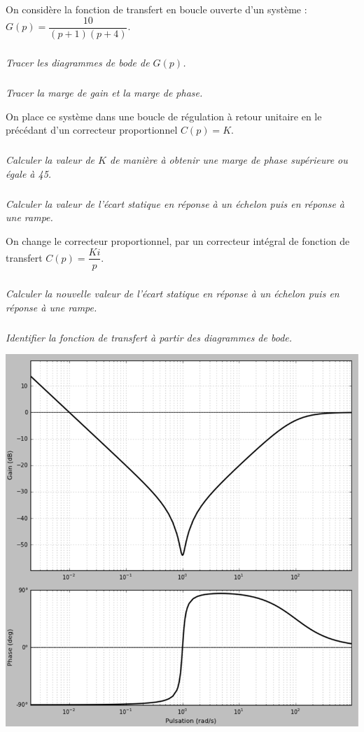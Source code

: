 \documentclass[10pt,fleqn]{article} %
\begin{document}

\vspace{8cm}
\pagestyle{fancy}
\thispagestyle{plain}

\def\columnseprulecolor{\color{ocre}}
\setlength{\columnseprule}{0.4pt} 

\def\pathfig{images}

\begin{multicols}{2}
On considère la fonction de transfert en boucle ouverte d’un système :
$G(p)=\dfrac{10}{\left( p+1\right)\left( p+4\right)}$.

\subparagraph{}\textit{Tracer les diagrammes de bode de $G(p)$.}
\subparagraph{}\textit{Tracer la marge de gain et la marge de phase.}

On place ce système dans une boucle de régulation à retour unitaire en le précédant d’un correcteur proportionnel $C(p)=K$.

\subparagraph{}\textit{Calculer la valeur de $K$ de manière à obtenir une marge de phase supérieure ou égale à 45\degres.}
\subparagraph{}\textit{Calculer la valeur de l’écart statique en réponse à un échelon puis en réponse à une rampe.}

On change le correcteur proportionnel, par un correcteur intégral de fonction de transfert $C(p)=\dfrac{Ki}{p}$.

\subparagraph{}\textit{Calculer la nouvelle valeur de l’écart statique en réponse à un échelon puis en réponse à une rampe.}

 
\end{multicols}

\newpage

\subparagraph{}\textit{Identifier la fonction de transfert à partir des diagrammes de bode.}



\begin{center}
\includegraphics[width=.8\linewidth]{images/fig_01}
\end{center}
\end{document}
